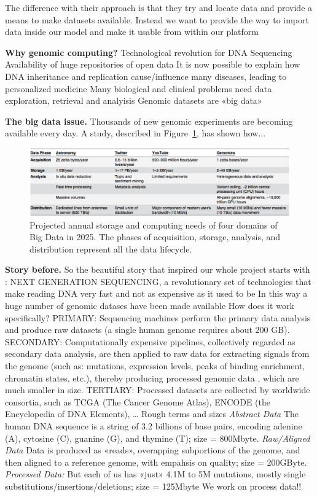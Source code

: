 \documentclass[journal]{IEEEtran}
\begin{document}
The difference with their approach is that they try and locate data and provide a means to make datasets available. Instead we want to provide the way to import data inside our model and make it usable from within our platform

\textbf{Why genomic computing?}
Technological revolution for DNA Sequencing
Availability of huge repositories of open data
It is now possible to explain how DNA inheritance and replication cause/influence many diseases, leading to personalized medicine
Many biological and clinical problems need data exploration, retrieval and analyisis
Genomic datasets are «big data»

\textbf{The big data issue.}
Thousands of new genomic experiments are becoming available every day. A study, described in Figure~\ref{fig:astrogeno}, has shown how...

\begin{figure}
  \includegraphics[width=\textwidth]{astrogeno}
  \caption{Projected annual storage and computing needs of four domains of Big Data in 2025. The phases of acquisition, storage, analysis, and distribution represent all the data lifecycle.}
  \label{fig:astrogeno}
\end{figure}

\textbf{Story before.}
So the beautiful story that inspired our whole project starts with :
NEXT GENERATION SEQUENCING, a revolutionary set of technologies that make reading DNA very fast and not as expensive as it used to be In this way a huge number of genomic datases have been made available
How does it work specifically?
PRIMARY: Sequencing machines perform the primary data analysis  and produce raw datasets (a single human genome requires about 200 GB). 
SECONDARY: Computationally expensive pipelines, collectively regarded as secondary data analysis, are then applied to raw data for extracting signals from the genome (such as: mutations,
expression levels, peaks of binding enrichment, chromatin states, etc.), thereby producing processed genomic data , which are much smaller in size.
TERTIARY: Processed datasets are collected by worldwide consortia, such as TCGA (The Cancer Genome Atlas), ENCODE (the Encyclopedia of DNA Elements), …
Rough terms and sizes
\textit{Abstract Data}
The human DNA sequence is a string of 3.2 billions of base pairs, encoding adenine (A), cytosine (C), guanine (G), and thymine (T); size = 800Mbyte.
\textit{Raw/Aligned Data} 
Data is produced as «reads», overapping subportions of the genome, and then aligned to a reference genome, with empahsis on quality; size = 200GByte. 
\textit{Processed Data:}
But each of us has «just» 4.1M to 5M mutations, mostly single substitutions/insertions/deletions; size = 125Mbyte
We work on process data!!
\end{document}
